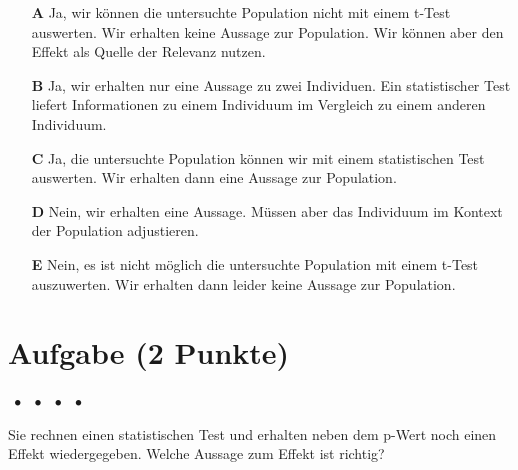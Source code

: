 \documentclass[a4paper, 9pt]{scrartcl}\usepackage[]{graphicx}\usepackage[]{xcolor}
\begin{document}
\begin{enumerate}
\item [\textbf{A} \msquare] Ja, wir können die untersuchte Population nicht mit einem t-Test auswerten. Wir erhalten keine Aussage zur Population. Wir können aber den Effekt als Quelle der Relevanz nutzen.
\item [\textbf{B} \msquare] Ja, wir erhalten nur eine Aussage zu zwei Individuen. Ein statistischer Test liefert Informationen zu einem Individuum im Vergleich zu einem anderen Individuum.
\item [\textbf{C} \msquare] Ja, die untersuchte Population können wir mit einem statistischen Test auswerten. Wir erhalten dann eine Aussage zur Population.
\item [\textbf{D} \msquare] Nein, wir erhalten eine Aussage. Müssen aber das Individuum im Kontext der Population adjustieren.
\item [\textbf{E} \msquare] Nein, es ist nicht möglich die untersuchte Population mit einem t-Test auszuwerten. Wir erhalten dann leider keine Aussage zur Population.
\end{enumerate}

\section{Aufgabe \hfill (2 Punkte)}

\ifcollection
\begin{flushright}
\tiny\vspace{-2Ex}
\textbf{\examinhaltstart}
\exammodulemathstat $\;\bullet$
\exammodulestat $\;\bullet$
\exammodulestatbbv $\;\bullet$
\exammodulestatversuch $\;\bullet$
\exammodulebiostat
\vspace{-1Ex}
\end{flushright}
\fi




Sie rechnen einen statistischen Test und erhalten neben dem p-Wert noch einen Effekt wiedergegeben. Welche Aussage zum Effekt ist richtig?
\end{document}
